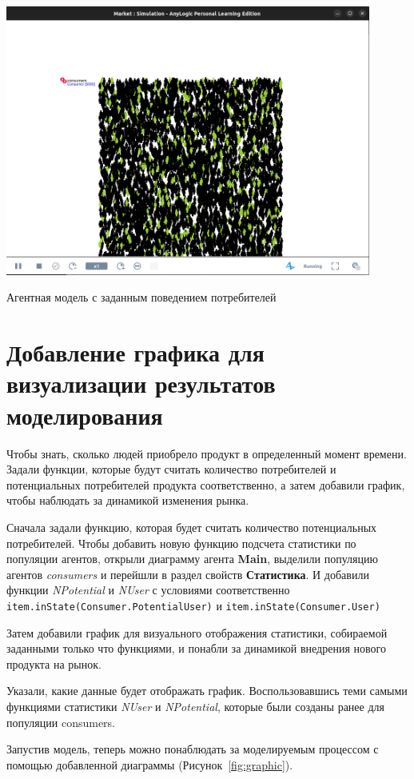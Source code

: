 \begin{image}
	\includegraphics[width=0.9\textwidth]{Screenshot from 2023-03-28 09-28-37.png}
	\caption{Агентная модель с заданным поведением потребителей}
	\label{fig:model:gedrag}
\end{image}

\section[Добавление графика для визуализации результатов]
	{Добавление графика для визуализации результатов моделирования}
Чтобы знать, сколько людей приобрело продукт в определенный
момент времени. Задали функции, которые будут считать
количество потребителей и потенциальных потребителей продукта
соответственно, а затем добавили график, чтобы наблюдать за динамикой
изменения рынка.\par
Сначала задали функцию, которая будет считать количество потенциальных
потребителей. Чтобы добавить новую функцию подсчета статистики по
популяции агентов, открыли диаграмму агента \textbf{Main}, выделили популяцию
агентов \textit{consumers} и перейшли в раздел
свойств \textbf{Статистика}. И добавили функции \textit{NPotential} и
\textit{NUser} с условиями соответственно
\texttt{item.inState(Consumer.PotentialUser)}
и \texttt{item.inState(Consumer.User)}\par
Затем добавили график для визуального отображения статистики,
собираемой заданными только что функциями, и понабли за динамикой
внедрения нового продукта на рынок.\par
Указали, какие данные будет отображать график. Воспользовавшись теми
самыми функциями статистики \textit{NUser} и \textit{NPotential},
которые были созданы ранее для популяции consumers.\par
Запустив модель, теперь можно понаблюдать за моделируемым процессом с помощью
добавленной диаграммы (Рисунок~\ref{fig:graphic}).

